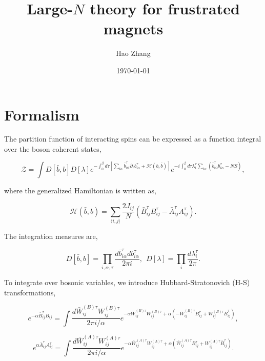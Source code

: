 \documentclass{article}
\begin{document}
\title{Large-$N$ theory for frustrated magnets}

\author{Hao Zhang}

\date{\today}

\maketitle

\section{Formalism}

\label{sec:formalism}

The partition function of interacting spins can be expressed as a
function integral over the boson coherent states,

\begin{equation}
\mathcal{Z}=\int D[\bar{b},b]D[\lambda]e^{-\int_{0}^{\beta}d\tau[\sum_{i\alpha}\bar{b}_{i\alpha}^{\tau}\partial_{\tau}b_{i\alpha}^{\tau}+\mathcal{H}(b,\bar{b})]}e^{-i\int_{0}^{\beta}d\tau\lambda_{i}^{\tau}\sum_{i\alpha}(\bar{b}_{i\alpha}^{\tau}b_{i\alpha}^{\tau}-NS)},
\end{equation}

where the generalized Hamiltonian is written as, 

\begin{equation}
\mathcal{H}(\bar{b},b)=\sum_{\langle i,j\rangle}\frac{2J_{ij}}{N}(\bar{B}_{ij}^{\tau}B_{ij}^{\tau}-\bar{A}_{ij}^{\tau}A_{ij}^{\tau}).
\end{equation}

The integration measures are, 

\begin{equation}
D[\bar{b},b]=\prod_{i,\alpha,\tau}\frac{d\bar{b}_{i\alpha}^{\tau}db_{i\alpha}^{\tau}}{2\pi i},\ \ D[\lambda]=\prod_{i}\frac{d\lambda_{i}^{\tau}}{2\pi}.
\end{equation}

To integrate over bosonic variables, we introduce Hubbard-Stratonovich
(H-S) transformations, 

\begin{equation}
e^{-\alpha\bar{B}_{ij}^{\tau}B_{ij}}=\int\frac{d\bar{W}_{ij}^{(B)\tau}W_{ij}^{(B)\tau}}{2\pi i/\alpha}e^{-\alpha\bar{W}_{ij}^{(B)\tau}W_{ij}^{(B)\tau}+\alpha(-\bar{W}_{ij}^{(B)\tau}B_{ij}^{\tau}+W_{ij}^{(B)\tau}\bar{B}_{ij}^{\tau})},
\end{equation}

\begin{equation}
e^{\alpha\bar{A}_{ij}^{\tau}A_{ij}^{\tau}}=\int\frac{d\bar{W}_{ij}^{(A)\tau}W_{ij}^{(A)\tau}}{2\pi i/\alpha}e^{-\alpha\bar{W}_{ij}^{(A)\tau}W_{ij}^{(A)\tau}+\alpha(\bar{W}_{ij}^{(A)\tau}B_{ij}^{\tau}+W_{ij}^{(A)\tau}\bar{B}_{ij}^{\tau})}.
\end{equation}
\end{document}

